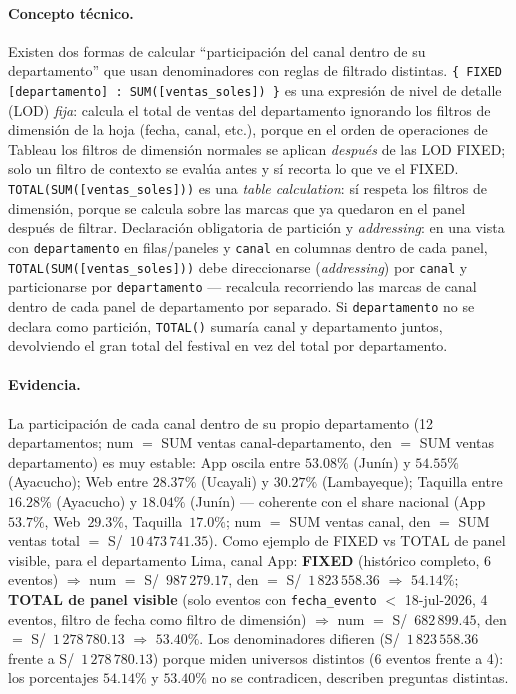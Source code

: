 \paragraph{Concepto técnico.} Existen dos formas de calcular \enquote{participación del canal dentro de su departamento} que usan denominadores con reglas de filtrado distintas. \lstinline|{ FIXED [departamento] : SUM([ventas_soles]) }| es una expresión de nivel de detalle (LOD) \emph{fija}: calcula el total de ventas del departamento ignorando los filtros de dimensión de la hoja (fecha, canal, etc.), porque en el orden de operaciones de Tableau los filtros de dimensión normales se aplican \emph{después} de las LOD FIXED; solo un filtro de contexto se evalúa antes y sí recorta lo que ve el FIXED. \lstinline|TOTAL(SUM([ventas_soles]))| es una \emph{table calculation}: sí respeta los filtros de dimensión, porque se calcula sobre las marcas que ya quedaron en el panel después de filtrar. Declaración obligatoria de partición y \emph{addressing}: en una vista con \lstinline|departamento| en filas/paneles y \lstinline|canal| en columnas dentro de cada panel, \lstinline|TOTAL(SUM([ventas_soles]))| debe direccionarse (\emph{addressing}) por \lstinline|canal| y particionarse por \lstinline|departamento| — recalcula recorriendo las marcas de canal dentro de cada panel de departamento por separado. Si \lstinline|departamento| no se declara como partición, \lstinline|TOTAL()| sumaría canal y departamento juntos, devolviendo el gran total del festival en vez del total por departamento.

\paragraph{Evidencia.} La participación de cada canal dentro de su propio departamento (12 departamentos; num $=$ SUM ventas canal-departamento, den $=$ SUM ventas departamento) es muy estable: App oscila entre $53.08\%$ (Junín) y $54.55\%$ (Ayacucho); Web entre $28.37\%$ (Ucayali) y $30.27\%$ (Lambayeque); Taquilla entre $16.28\%$ (Ayacucho) y $18.04\%$ (Junín) — coherente con el share nacional (App~$53.7\%$, Web~$29.3\%$, Taquilla~$17.0\%$; num $=$ SUM ventas canal, den $=$ SUM ventas total $=$ S/~$10\,473\,741.35$). Como ejemplo de FIXED vs TOTAL de panel visible, para el departamento Lima, canal App: \textbf{FIXED} (histórico completo, 6 eventos) $\Rightarrow$ num $=$ S/~$987\,279.17$, den $=$ S/~$1\,823\,558.36$ $\Rightarrow$ $54.14\%$; \textbf{TOTAL de panel visible} (solo eventos con \lstinline|fecha_evento| $<$ 18-jul-2026, 4 eventos, filtro de fecha como filtro de dimensión) $\Rightarrow$ num $=$ S/~$682\,899.45$, den $=$ S/~$1\,278\,780.13$ $\Rightarrow$ $53.40\%$. Los denominadores difieren (S/~$1\,823\,558.36$ frente a S/~$1\,278\,780.13$) porque miden universos distintos (6 eventos frente a 4): los porcentajes $54.14\%$ y $53.40\%$ no se contradicen, describen preguntas distintas.

